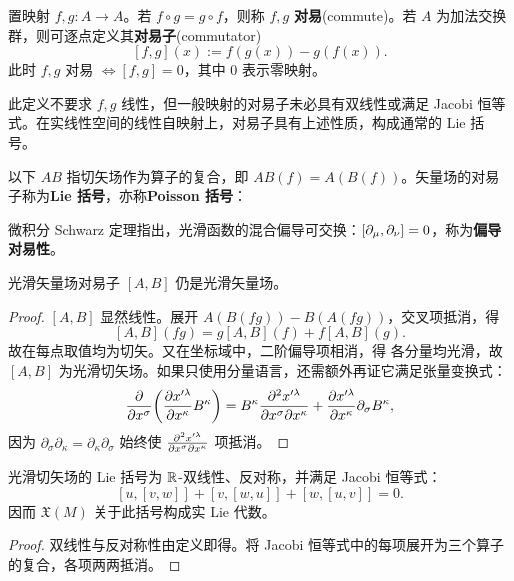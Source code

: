 \begin{definition}
    置映射 $f,g:A\to A$。若 $f\circ g=g\circ f$，则称 $f,g$ \textbf{对易}(commute)。若 $A$ 为加法交换群，则可逐点定义其\textbf{对易子}(commutator)
    \[
        [f,g](x):=f(g(x))-g(f(x)).
    \]
    此时 $f,g$ 对易 $\iff[f,g]=0$，其中 $0$ 表示零映射。
\end{definition}

\begin{remark}
    此定义不要求 $f,g$ 线性，但一般映射的对易子未必具有双线性或满足 Jacobi 恒等式。在实线性空间的线性自映射上，对易子具有上述性质，构成通常的 Lie 括号。
\end{remark}

以下 $AB$ 指切矢场作为算子的复合，即 $AB(f)=A(B(f))$。矢量场的对易子称为\textbf{Lie 括号}，亦称\textbf{Poisson 括号}：

\begin{example}
    微积分 Schwarz 定理指出，光滑函数的混合偏导可交换：$ [\partial_\mu,\partial_\nu ]=0$，称为\textbf{偏导对易性}。
\end{example}

\begin{theorem}
    光滑矢量场对易子 $[A,B]$ 仍是光滑矢量场。
\end{theorem}
\begin{proof}
    $[A,B]$ 显然线性。展开 $A(B(fg))-B(A(fg))$，交叉项抵消，得
    \[
        [A,B](fg)=g[A,B](f)+f[A,B](g).
    \]
    故在每点取值均为切矢。又在坐标域中，二阶偏导项相消，得
    各分量均光滑，故 $[A,B]$ 为光滑切矢场。如果只使用分量语言，还需额外再证它满足张量变换式：
    \[
        \pdv{x^\sigma}(\pdv{x'^\lambda}{x^\kappa}B^\kappa)=  B^\kappa\pdv{x'^\lambda}{x^\sigma}{x^\kappa}+\pdv{x'^\lambda}{x^\kappa}\partial_\sigma B^\kappa,
    \]
    因为 $\partial_\sigma\partial_\kappa=\partial_\kappa\partial_\sigma$ 始终使 $\pdv{x'^\lambda}{x^\sigma}{x^\kappa}$ 项抵消。
\end{proof}

\begin{theorem}\label{chdm:thm_poisson-Lie-bracket}
    光滑切矢场的 Lie 括号为 $\mathbb{R}$-双线性、反对称，并满足 Jacobi 恒等式：
    \[
        [u,[v,w]]+[v,[w,u]]+[w,[u,v]]=0.
    \]
    因而 $\mathfrak X(M)$ 关于此括号构成实 Lie 代数。
\end{theorem}
\begin{proof}
    双线性与反对称性由定义即得。将 Jacobi 恒等式中的每项展开为三个算子的复合，各项两两抵消。
\end{proof}

